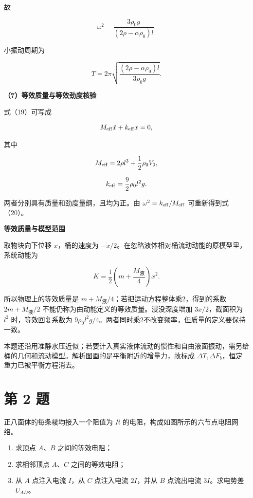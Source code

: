 \documentclass[12pt,a4paper,UTF8]{ctexart}
\newcommand{\tightlist}{\setlength{\itemsep}{0pt}\setlength{\parskip}{0pt}}
\begin{document}
故

\[
\boxed{
\omega^2
=\frac{3\rho_0g}
{(2\rho-\alpha\rho_0)l}
}.
\tag{22}
\]

小振动周期为

\[
\boxed{
T=2\pi
\sqrt{
\frac{(2\rho-\alpha\rho_0)l}
{3\rho_0g}
}
}.
\tag{23}
\]

\textbf{（7）等效质量与等效劲度核验}

式（19）可写成

\[
M_{\rm eff}\ddot x+k_{\rm eff}x=0,
\]

其中

\[
M_{\rm eff}
=2\rho l^3+\frac12\rho_0V_0,
\]

\[
k_{\rm eff}=\frac92\rho_0l^2g.
\]

两者分别具有质量和劲度量纲，且均为正。由
\(\omega^2=k_{\rm eff}/M_{\rm eff}\) 可重新得到式（20）。

\textbf{等效质量与模型范围}

取物块向下位移 \(x\)，桶的速度为
\(-\dot x/2\)。在忽略液体相对桶流动动能的原模型里，系统动能为

\[K=\frac12\left(m+\frac{M_{\text{液}}}4\right)\dot x^2.\]

所以物理上的等效质量是
\(m+M_{\text{液}}/4\)；若把运动方程整体乘2，得到的系数
\(2m+M_{\text{液}}/2\) 不能仍称为由动能定义的等效质量。浸没深度增加
\(3x/2\)，截面积为 \(l^2\) 时，等效回复系数为
\(9\rho_0l^2g/4\)。两者同时乘2不改变频率，但质量的定义要保持一致。

本题还沿用准静水压近似；若要计入真实液体流动的惯性和自由液面振动，需另给桶的几何和流动模型。解析图画的是平衡附近的增量力，故标成
\(\Delta T,\Delta F_b\)，恒定重力已被平衡方程消去。

\newpage

\section{第 2 题}\label{ux7b2c-2-ux9898}

正八面体的每条棱均接入一个阻值为 \(R\)
的电阻，构成如图所示的六节点电阻网络。

\begin{enumerate}
\def\labelenumi{\arabic{enumi}.}
\tightlist
\item
  求顶点 \(A\)、\(B\) 之间的等效电阻；
\item
  求相邻顶点 \(A\)、\(C\) 之间的等效电阻；
\item
  从 \(A\) 点注入电流 \(I\)，从 \(C\) 点注入电流 \(2I\)，并从 \(B\)
  点流出电流 \(3I\)。求电势差 \(U_{AD}\)。
\end{enumerate}
\end{document}
